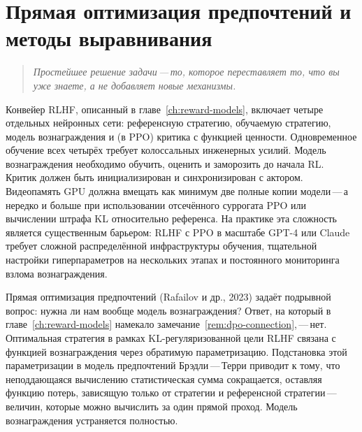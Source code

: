 \chapter[DPO и методы выравнивания]{Прямая оптимизация предпочтений и методы выравнивания}
\label{ch:dpo}

\begin{quote}
\itshape
Простейшее решение задачи\,---\,то, которое переставляет то, что вы уже знаете, а не добавляет новые механизмы.
\end{quote}

\bigskip

Конвейер RLHF, описанный в главе~\ref{ch:reward-models}, включает четыре отдельных нейронных сети: референсную стратегию, обучаемую стратегию, модель вознаграждения и (в PPO) критика с функцией ценности. Одновременное обучение всех четырёх требует колоссальных инженерных усилий. Модель вознаграждения необходимо обучить, оценить и заморозить до начала RL. Критик должен быть инициализирован и синхронизирован с актором. Видеопамять GPU должна вмещать как минимум две полные копии модели\,---\,а нередко и больше при использовании отсечённого суррогата PPO или вычислении штрафа KL относительно референса. На практике эта сложность является существенным барьером: RLHF с PPO в масштабе GPT-4 или Claude требует сложной распределённой инфраструктуры обучения, тщательной настройки гиперпараметров на нескольких этапах и постоянного мониторинга взлома вознаграждения.

Прямая оптимизация предпочтений (Rafailov и др., 2023) задаёт подрывной вопрос: нужна ли нам вообще модель вознаграждения? Ответ, на который в главе~\ref{ch:reward-models} намекало замечание~\ref{rem:dpo-connection},\,---\,нет. Оптимальная стратегия в рамках KL-регуляризованной цели RLHF связана с функцией вознаграждения через обратимую параметризацию. Подстановка этой параметризации в модель предпочтений Брэдли\,---\,Терри приводит к тому, что неподдающаяся вычислению статистическая сумма сокращается, оставляя функцию потерь, зависящую только от стратегии и референсной стратегии\,---\,величин, которые можно вычислить за один прямой проход. Модель вознаграждения устраняется полностью.

